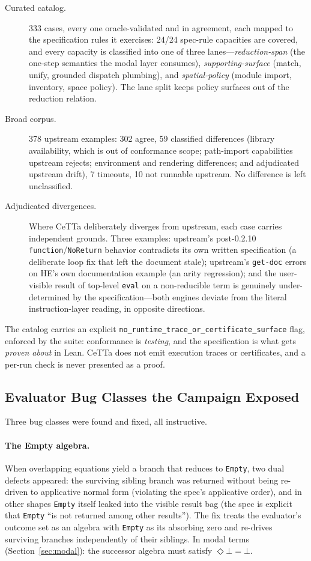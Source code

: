 \documentclass[11pt]{article}
\newcommand{\code}[1]{\texttt{#1}}
\newcommand{\HE}{\textup{HE}}
\newcommand{\CeTTa}{\textup{CeTTa}}
\begin{document}
\begin{description}
\item[Curated catalog.] 333 cases, every one oracle-validated and in
  agreement, each mapped to the specification rules it exercises:
  24/24 spec-rule capacities are covered, and every capacity is
  classified into one of three lanes---\emph{reduction-span} (the
  one-step semantics the modal layer consumes),
  \emph{supporting-surface} (match, unify, grounded dispatch
  plumbing), and \emph{spatial-policy} (module import, inventory,
  space policy).  The lane split keeps policy surfaces out of the
  reduction relation.
\item[Broad corpus.] 378 upstream examples: 302 agree, 59 classified
  differences (library availability, which is out of conformance
  scope; path-import capabilities upstream rejects; environment and
  rendering differences; and adjudicated upstream drift), 7 timeouts,
  10 not runnable upstream.  No difference is left unclassified.
\item[Adjudicated divergences.] Where \CeTTa{} deliberately diverges
  from upstream, each case carries independent grounds.  Three
  examples: upstream's post-0.2.10 \code{function}/\code{NoReturn}
  behavior contradicts its own written specification (a deliberate
  loop fix that left the document stale); upstream's \code{get-doc}
  errors on \HE{}'s own documentation example (an arity regression);
  and the user-visible result of top-level \code{eval} on a
  non-reducible term is genuinely under-determined by the
  specification---both engines deviate from the literal
  instruction-layer reading, in opposite directions.
\end{description}

The catalog carries an explicit
\code{no\_runtime\_trace\_or\_certificate\_surface} flag, enforced by
the suite: conformance is \emph{testing}, and the specification is
what gets \emph{proven about} in Lean.  \CeTTa{} does not emit
execution traces or certificates, and a per-run check is never
presented as a proof.

\subsection{Evaluator Bug Classes the Campaign Exposed}
\label{sec:bugclasses}

Three bug classes were found and fixed, all instructive.

\paragraph{The Empty algebra.}  When overlapping equations yield a
branch that reduces to \code{Empty}, two dual defects appeared: the
surviving sibling branch was returned without being re-driven to
applicative normal form (violating the spec's applicative order), and
in other shapes \code{Empty} itself leaked into the visible result bag
(the spec is explicit that \code{Empty} ``is not returned among other
results'').  The fix treats the evaluator's outcome set as an algebra
with \code{Empty} as its absorbing zero and re-drives surviving
branches independently of their siblings.  In modal terms
(Section~\ref{sec:modal}): the successor algebra must satisfy
$\Diamond\bot = \bot$.
\end{document}
